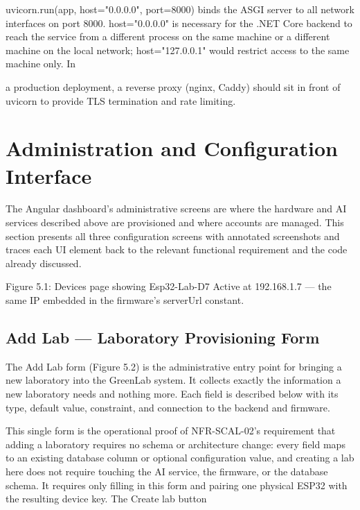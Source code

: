 uvicorn.run(app, host="0.0.0.0", port=8000) binds the ASGI server to all
network interfaces on port 8000. host="0.0.0.0" is necessary for the .NET Core backend
to reach the service from a different process on the same machine or a different machine on
the local network; host="127.0.0.1" would restrict access to the same machine only. In



a production deployment, a reverse proxy (nginx, Caddy) should sit in front of uvicorn to
provide TLS termination and rate limiting.



\section{Administration and Conﬁguration Interface}


The Angular dashboard's administrative screens are where the hardware and AI services
described above are provisioned and where accounts are managed. This section presents all
three conﬁguration screens with annotated screenshots and traces each UI element back to
the relevant functional requirement and the code already discussed.




Figure 5.1: Devices page showing Esp32-Lab-D7 Active at 192.168.1.7 --- the same IP embedded
in the ﬁrmware's serverUrl constant.




\subsection{Add Lab --- Laboratory Provisioning Form}


The Add Lab form (Figure 5.2) is the administrative entry point for bringing a new laboratory into the GreenLab system. It collects exactly the information a new laboratory needs
and nothing more. Each ﬁeld is described below with its type, default value, constraint, and
connection to the backend and ﬁrmware.

This single form is the operational proof of NFR-SCAL-02's requirement that adding
a laboratory requires no schema or architecture change: every ﬁeld maps to an existing
database column or optional conﬁguration value, and creating a lab here does not require
touching the AI service, the ﬁrmware, or the database schema. It requires only ﬁlling in this
form and pairing one physical ESP32 with the resulting device key. The Create lab button






